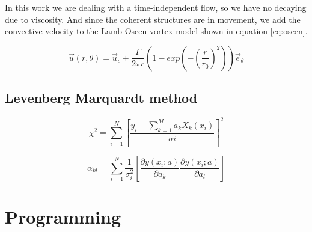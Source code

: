 \documentclass[12pt, a4paper, openany]{memoir}
\begin{document}
In this work we are dealing with a time-independent flow, so we have no decaying due to viscosity. And since the coherent structures are in movement, we add the convective velocity to the Lamb-Oseen vortex model shown in equation \ref{eq:oseen}.  

\begin{equation}
\label{eq:oseen}
\vec{u}(r,\theta) = \vec{u}_c + \frac{\Gamma}{2\pi r} \left( 1 - exp \left( -\left(\frac{r}{r_0}\right)^2\right)\right) \vec{e}_{\theta}
\end{equation}

\section{Levenberg Marquardt method}

\begin{equation}
\chi^2 = \sum_{i=1}^N \left[ \frac{y_i - \sum_{k=1}^M a_k X_k (x_i)}{\sigma i} \right]^2
\end{equation}

\begin{equation}
\alpha_{kl} = \sum_{i=1}^N \frac{1}{\sigma_i^2} \left[ \frac{\partial y(x_i;a)}{\partial a_k} \frac{\partial y(x_i;a)}{\partial a_l} \right]
\end{equation}

\chapter{Programming}
\end{document}
